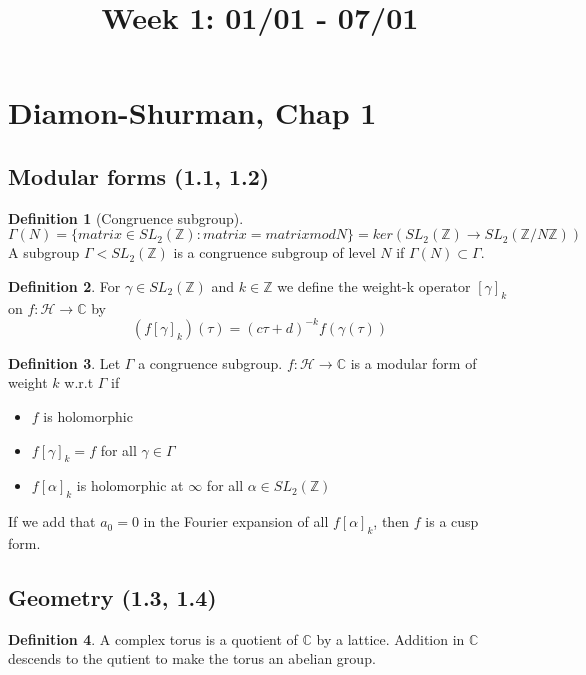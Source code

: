 \documentclass[11pt]{article}
\title{Week 1: 01/01 - 07/01}
\date{}
\theoremstyle{definition}
\newtheorem{definition}{Definition}[section]
\theoremstyle{example}
\theoremstyle{lemma}
\theoremstyle{proposition}
\theoremstyle{theorem}
\begin{document}
\maketitle
\section{Diamon-Shurman, Chap 1}
\subsection{Modular forms (1.1, 1.2)}
\begin{definition}[Congruence subgroup]
$$ \Gamma(N) = \{ matrix \in SL_2(\mathbb{Z}) : matrix = matrix mod N \} = ker(SL_2(\mathbb{Z}) \to SL_2(\mathbb{Z}/N\mathbb{Z}))$$
A subgroup $\Gamma < SL_2(\mathbb{Z})$ is a congruence subgroup of level $N$ if $\Gamma(N) \subset \Gamma$.
\end{definition}

\begin{definition}
For $\gamma \in SL_2(\mathbb{Z})$ and $k\in \mathbb{Z}$ we define the weight-k operator $[\gamma]_k$ on $f: \mathcal{H} \to \mathbb{C}$ by 
$$ (f[\gamma]_k) ( \tau) = (c\tau + d)^{-k} f(\gamma(\tau))$$
\end{definition}

\begin{definition}
Let $\Gamma$ a congruence subgroup. $f: \mathcal{H} \to \mathbb{C}$ is a modular form of weight $k$ w.r.t $\Gamma$ if 
\begin{itemize}
\item $f$ is holomorphic
\item $f[\gamma]_k = f$ for all $\gamma \in \Gamma$
\item $f[\alpha]_k$ is holomorphic at $\infty$ for all $\alpha \in SL_2(\mathbb{Z})$
\end{itemize}
If we add that $a_0 = 0$ in the Fourier expansion of all $f[\alpha]_k$, then $f$ is a cusp form.
\end{definition}

\subsection{Geometry (1.3, 1.4)}
\begin{definition}
A complex torus is a quotient of $\mathbb{C}$ by a lattice. Addition in $\mathbb{C}$ descends to the qutient to make the torus an abelian group.
\end{definition}
\end{document}
